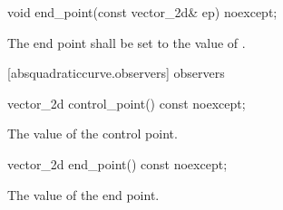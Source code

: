 \begin{itemdecl}
    void end_point(const vector_2d& ep) noexcept;
\end{itemdecl}
\begin{itemdescr}
	\pnum
	\effects
	The end point shall be set to the value of .
\end{itemdescr}

 [absquadraticcurve.observers]{ observers}

\begin{itemdecl}
    vector_2d control_point() const noexcept;
\end{itemdecl}
\begin{itemdescr}
	\pnum
	\returns
	The value of the control point.
\end{itemdescr}

\begin{itemdecl}
    vector_2d end_point() const noexcept;
\end{itemdecl}
\begin{itemdescr}
	\pnum
	\returns
	The value of the end point.
\end{itemdescr}

